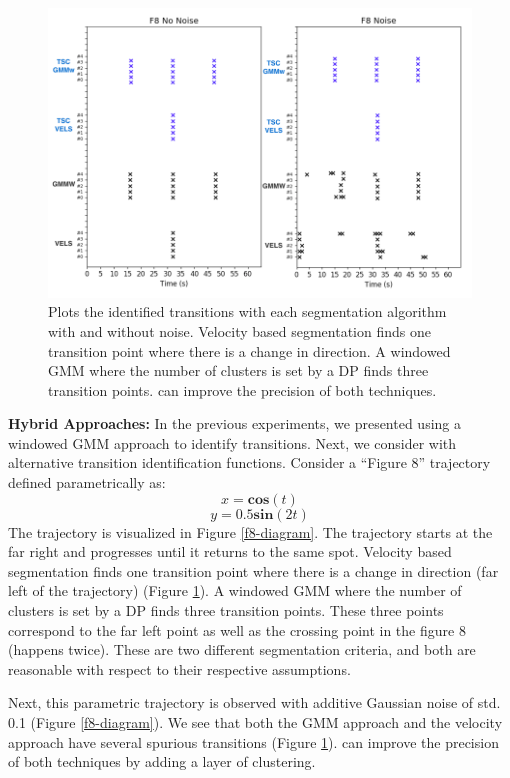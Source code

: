 \begin{figure}%
\centering
\includegraphics[width=\columnwidth]{tsc-experiments/hybrid_approach.png}
\caption{Plots the identified transitions with each segmentation algorithm with and without noise. Velocity based segmentation finds one transition point where there is a change in direction. A windowed GMM where the number of clusters is set by a DP finds three transition points. \tsc can improve the precision of both techniques.  \label{f8-results}}
\end{figure}


\textbf{Hybrid Approaches: } In the previous experiments, we presented \tsc using a windowed GMM approach to identify transitions. Next, we consider \tsc with alternative transition identification functions.
Consider a ``Figure 8'' trajectory defined parametrically as:
\[
x = \textbf{cos}(t)
\]
\[
y = 0.5\textbf{sin}(2t)
\]
The trajectory is visualized in Figure \ref{f8-diagram}. The trajectory starts at the far right and progresses until it returns to the same spot. Velocity based segmentation finds one transition point where there is a change in direction (far left of the trajectory) (Figure \ref{f8-results}). 
A windowed GMM where the number of clusters is set by a DP finds three transition points. 
These three points correspond to the far left point as well as the crossing point in the figure 8 (happens twice).
These are two different segmentation criteria, and both are reasonable with respect to their respective assumptions.

Next, this parametric trajectory is observed with additive Gaussian noise of std. 0.1 (Figure \ref{f8-diagram}).
We see that both the GMM approach and the velocity approach have several spurious transitions (Figure \ref{f8-results}).
\tsc can improve the precision of both techniques by adding a layer of clustering.


